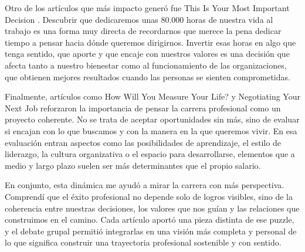 Otro de los artículos que más impacto generó fue This Is Your Most Important Decision \cite{80000hours}. Descubrir que dedicaremos unas 80.000 horas de nuestra vida al trabajo es una forma muy directa de recordarnos que merece la pena dedicar tiempo a pensar hacia dónde queremos dirigirnos. Invertir esas horas en algo que tenga sentido, que aporte y que encaje con nuestros valores es una decisión que afecta tanto a nuestro bienestar como al funcionamiento de las organizaciones, que obtienen mejores resultados cuando las personas se sienten comprometidas.

Finalmente, artículos como How Will You Measure Your Life? \cite{christensen-measure-life} y Negotiating Your Next Job \cite{hbr-negotiating-next-job} reforzaron la importancia de pensar la carrera profesional como un proyecto coherente. No se trata de aceptar oportunidades sin más, sino de evaluar si encajan con lo que buscamos y con la manera en la que queremos vivir. En esa evaluación entran aspectos como las posibilidades de aprendizaje, el estilo de liderazgo, la cultura organizativa o el espacio para desarrollarse, elementos que a medio y largo plazo suelen ser más determinantes que el propio salario.

En conjunto, esta dinámica me ayudó a mirar la carrera con más perspectiva. Comprendí que el éxito profesional no depende solo de logros visibles, sino de la coherencia entre nuestras decisiones, los valores que nos guían y las relaciones que construimos en el camino. Cada artículo aportó una pieza distinta de ese puzzle, y el debate grupal permitió integrarlas en una visión más completa y personal de lo que significa construir una trayectoria profesional sostenible y con sentido.
